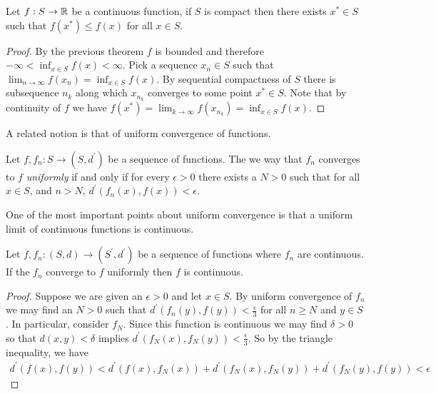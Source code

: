 \begin{thm}\label{ExistenceGlobalMinimizerContinuous}Let $f : S \to \mathbb{R}$ be a continuous function, if $S$ is
  compact then there exists $x^* \in S$ such that $f(x^*) \leq f(x)$ for  all $x \in S$.
\end{thm}
\begin{proof}
By the previous theorem $f$ is bounded and therefore $-\infty < \inf_{x \in S} f(x) < \infty$.  Pick a sequence $x_n \in S$ such
that $\lim_{n \to \infty} f(x_n) = \inf_{x \in S} f(x)$.  By sequential compactness of $S$ there is subsequence $n_k$ along which $x_{n_k}$ 
converges to some point $x^* \in S$.  Note that by continuity of $f$ we have $f(x^*) = \lim_{k \to \infty} f(x_{n_k}) = \inf_{x \in S} f(x)$.
\end{proof}

A related notion is that of uniform convergence of functions.
\begin{defn}Let $f, f_n : S \to (S, d^\prime)$ be a sequence
  of functions.  The we way that $f_n$ converges to $f$
  \emph{uniformly} if and only if for every $\epsilon > 0$ there
  exists a $N > 0$ such that for all $x \in S$, and $n > N$, $d^\prime(f_n(x), f(x)) < \epsilon$.
\end{defn}

One of the most important points about uniform convergence is that a
uniform limit of continuous functions is continuous.
\begin{lem}\label{UniformLimitContinuousFunctionsIsContinuous}Let $f,
  f_n : (S,d) \to (S^\prime, d^\prime)$ be a sequence
  of functions where $f_n$ are continuous.  If the $f_n$ converge
  to $f$ uniformly then $f$ is continuous.
\end{lem}
\begin{proof}
Suppose we are given an $\epsilon > 0$ and let $x \in S$.  By uniform
convergence of $f_n$ we may find an $N > 0$ such that
$d^\prime(f_n(y), f(y)) < \frac{\epsilon}{3}$ for all $n \geq N$ and
$y \in S$.  In particular, consider $f_N$.  Since this function is
continuous we may find $\delta > 0$ so that $d(x,y) < \delta$ implies
$d^\prime(f_N(x), f_N(y)) < \frac{\epsilon}{3}$.  So by the triangle
inequality, we have 
\begin{align*}
d^\prime(f(x), f(y)) < d^\prime(f(x), f_N(x)) + d^\prime(f_N(x),
f_N(y)) + d^\prime(f_N(y), f(y)) < \epsilon
\end{align*}
\end{proof}

